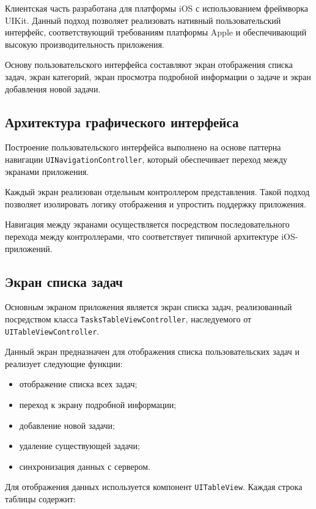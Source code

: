 \documentclass[14pt,a4paper]{extarticle}
\begin{document}
Клиентская часть разработана для платформы iOS с использованием фреймворка UIKit. Данный подход позволяет реализовать нативный пользовательский интерфейс, соответствующий требованиям платформы Apple и обеспечивающий высокую производительность приложения.

Основу пользовательского интерфейса составляют экран отображения списка задач, экран категорий, экран просмотра подробной информации о задаче и экран добавления новой задачи.

\subsection{Архитектура графического интерфейса}

Построение пользовательского интерфейса выполнено на основе паттерна навигации \texttt{UINavigationController}, который обеспечивает переход между экранами приложения.

Каждый экран реализован отдельным контроллером представления. Такой подход позволяет изолировать логику отображения и упростить поддержку приложения.

Навигация между экранами осуществляется посредством последовательного перехода между контроллерами, что соответствует типичной архитектуре iOS-приложений.

\subsection{Экран списка задач}

Основным экраном приложения является экран списка задач, реализованный посредством класса \texttt{TasksTableViewController}, наследуемого от \texttt{UITableViewController}.

Данный экран предназначен для отображения списка пользовательских задач и реализует следующие функции:

\begin{itemize}
    \item отображение списка всех задач;
    \item переход к экрану подробной информации;
    \item добавление новой задачи;
    \item удаление существующей задачи;
    \item синхронизация данных с сервером.
\end{itemize}

Для отображения данных используется компонент \texttt{UITableView}. Каждая строка таблицы содержит:
\end{document}
